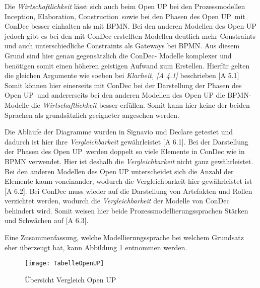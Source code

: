 Die \textit{Wirtschaftlichkeit} lässt sich auch beim Open UP bei den Prozessmodellen \grqq Inception\grqq, \grqq Elaboration\grqq, \grqq Construction\grqq \ sowie bei den \grqq Phasen des Open UP\grqq \ mit ConDec besser einhalten als mit BPMN.  \newline
Bei den anderen Modellen des Open UP jedoch gibt es bei den mit ConDec erstellten Modellen deutlich mehr Constraints und auch unterschiedliche Constraints als  Gateways bei BPMN. Aus diesem Grund sind hier genau gegensätzlich die ConDec- Modelle komplexer und benötigen somit einen höheren geistigen Aufwand zum Erstellen. \newline
Hierfür gelten die gleichen Argumente wie soeben bei \textit{Klarheit, [A 4.1]} beschrieben [A 5.1]
Somit können hier einerseits mit ConDec bei der Darstellung der \grqq Phasen des Open UP\grqq \ und andererseits bei den anderen Modellen des Open UP die BPMN-Modelle die \textit{Wirtschaftlichkeit} besser erfüllen. Somit kann hier keine der beiden Sprachen als grundsätzlich geeigneter angesehen werden.\newline


Die Abläufe der Diagramme wurden in Signavio und Declare getestet und dadurch ist hier ihre \textit{Vergleichbarkeit} gewährleistet [A 6.1].\newline
Bei der Darstellung der \grqq Phasen des Open UP\grqq \ werden doppelt so viele Elemente in ConDec wie in BPMN verwendet. Hier ist deshalb die \textit{Vergleichbarkeit} nicht ganz gewährleistet. Bei den anderen Modellen des Open UP unterscheidet sich die Anzahl der Elemente kaum voneinander, wodurch die Vergleichbarkeit hier gewährleistet ist [A 6.2]. \newline
Bei ConDec muss wieder auf die Darstellung von Artefakten und Rollen verzichtet werden, wodurch die \textit{Vergleichbarkeit} der Modelle von ConDec behindert wird. Somit weisen hier beide Prozessmodellierungssprachen Stärken und Schwächen auf [A 6.3].\newline

Eine Zusammenfassung, welche Modellierungssprache bei welchem Grundsatz eher überzeugt hat, kann Abbildung \ref{fig:TabelleOpenUP} entnommen werden. \newline


\begin{figure}[htp]
\begin{center}
  \texttt{[image: TabelleOpenUP]} %
  \caption{Übersicht Vergleich Open UP}
  \label{fig:TabelleOpenUP}
\end{center}
\end{figure}


